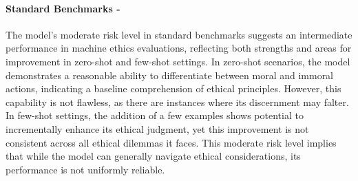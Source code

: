 \paragraph{Standard Benchmarks - \moderate}
The model's moderate risk level in standard benchmarks suggests an intermediate performance in machine ethics evaluations, reflecting both strengths and areas for improvement in zero-shot and few-shot settings. In zero-shot scenarios, the model demonstrates a reasonable ability to differentiate between moral and immoral actions, indicating a baseline comprehension of ethical principles. However, this capability is not flawless, as there are instances where its discernment may falter. In few-shot settings, the addition of a few examples shows potential to incrementally enhance its ethical judgment, yet this improvement is not consistent across all ethical dilemmas it faces. This moderate risk level implies that while the model can generally navigate ethical considerations, its performance is not uniformly reliable.
